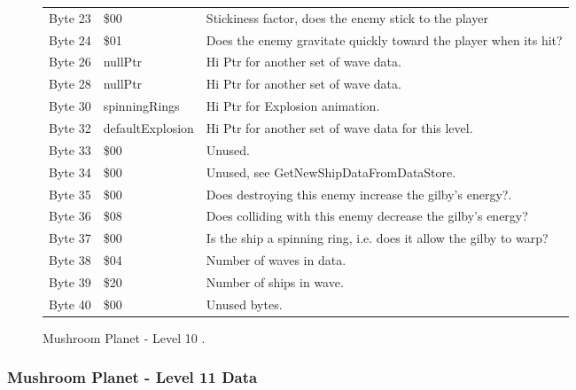 \begin{figure}[H]
{\begin{adjustbox}{width=12cm}
\begin{tabular}{lll}
 Byte 23 & \$00                        & Stickiness factor, does the enemy stick to the player              \\
 Byte 24 & \$01                        & Does the enemy gravitate quickly toward the player when its hit?   \\
 Byte 26 & nullPtr                    & Hi Ptr for another set of wave data.                               \\
 Byte 28 & nullPtr                    & Hi Ptr for another set of wave data.                               \\
 Byte 30 & spinningRings              & Hi Ptr for Explosion animation.                                    \\
 Byte 32 & defaultExplosion           & Hi Ptr for another set of wave data for this level.                \\
 Byte 33 & \$00                        & Unused.                                                            \\
 Byte 34 & \$00                        & Unused, see GetNewShipDataFromDataStore.                           \\
 Byte 35 & \$00                        & Does destroying this enemy increase the gilby's energy?.           \\
 Byte 36 & \$08                        & Does colliding with this enemy decrease the gilby's energy?        \\
 Byte 37 & \$00                        & Is the ship a spinning ring, i.e. does it allow the gilby to warp? \\
 Byte 38 & \$04                        & Number of waves in data.                                           \\
 Byte 39 & \$20                        & Number of ships in wave.                                           \\
 Byte 40 & \$00                        & Unused bytes.                                                      \\
\bottomrule
\end{tabular}

  \end{adjustbox}

  }\caption*{Mushroom Planet - Level 10
.}
\end{figure}

\clearpage
\subsubsection{Mushroom Planet - Level 11 Data}


